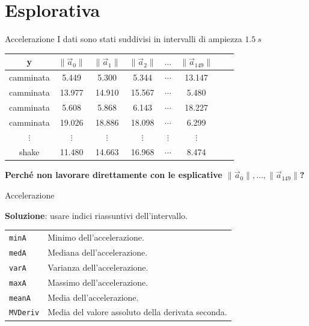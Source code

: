 \documentclass{beamer}
\begin{document}
\section{Esplorativa}
\begin{frame}{Accelerazione}
I dati sono stati suddivisi in intervalli di ampiezza $\SI{1.5}{s}$
\begin{table}[H]
\begin{tabular}{cccccccc}
\toprule
y & $\|\vec{a}_0\|$ & $\|\vec{a}_1\|$ & $\|\vec{a}_2\|$  & $\dots$ & $\|\vec{a}_{149}\|$\\
\midrule
camminata & 5.449 & 5.300 & 5.344 &  $\cdots$ & 13.147\\
camminata & 13.977 & 14.910 & 15.567 &  $\cdots$ & 5.480\\
camminata & 5.608 & 5.868 & 6.143 &  $\cdots$ & 18.227\\
camminata & 19.026 & 18.886 & 18.098 &  $\cdots$ & 6.299\\
$\vdots$ & $\vdots$ & $\vdots$ & $\vdots$ &  $\vdots$ & $\vdots$\\
shake & 11.480 & 14.663 & 16.968 &  $\cdots$ & 8.474\\
\bottomrule
\end{tabular}
\end{table}
\begin{center}
\pause \textbf{Perché non lavorare direttamente con le esplicative $\|\vec{a}_0\|,\dots,\|\vec{a}_{149}\|$?}
\end{center}
\end{frame}

\begin{frame}{Accelerazione}
	\begin{figure}[H]
		\centering
	\end{figure}
\pause
\textbf{Soluzione}: usare indici riassuntivi dell'intervallo.
\begin{table}[H]
	\centering
	\begin{tabular}{ll}
		\texttt{minA}& Minimo dell'accelerazione.\\
		\texttt{medA}& Mediana dell'accelerazione.\\
		\texttt{varA}& Varianza dell'accelerazione.\\
		\texttt{maxA}& Massimo dell'accelerazione.\\
		\texttt{meanA}& Media dell'accelerazione.\\
		\texttt{MVDeriv}& Media del valore assoluto della derivata seconda.
	\end{tabular}
\end{table}
\end{frame}
\end{document}
